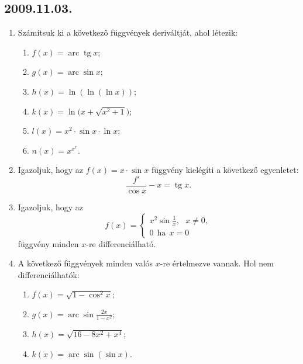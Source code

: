 \documentclass{article}
\newenvironment{abc}{\begin{enumerate}[label=\textit{\alph*})]}{\end{enumerate}}
\newcommand{\tg}{\mathop{\mathrm{tg}}\nolimits}
\newcommand{\arc}{\mathop{\mathrm{arc}}\nolimits}
\renewcommand{\arcsin}{\arc\sin}
\newcommand{\arctg}{\arc\tg}
\begin{document}
\subsection*{2009.11.03.}
\begin{enumerate}
\item Számítsuk ki a következő függvények deriváltját, ahol létezik:
	\begin{abc}
	\item $f(x)=\arctg x$;
	\item $g(x)=\arcsin x$;
	\item $h(x)=\ln(\ln(\ln x))$;
	\item $k(x)=\ln \big(x+\sqrt{x^2+1}\big)$;
	\item $l(x)=x^2\cdot \sin x \cdot \ln x$;
	\item $n(x)=x^{x^x}$.
	\end{abc}
\item Igazoljuk, hogy az $f(x)=x\cdot \sin x$ függvény kielégíti a következő egyenletet:
	\[ \frac{f'}{\cos x}-x=\tg x. \]
\item Igazoljuk, hogy az 
	\[  f(x) = 
	  \begin{cases} 
	   x^2 \sin \frac{1}{x},~~~x\neq 0, \\
	   0~~\text{ha}~~x =0
	  \end{cases} \]
	  függvény minden $x$-re differenciálható.
\item A következő függvények minden valós $x$-re értelmezve vannak. Hol nem 					differenciálhatók:
	\begin{abc}
	\item $f(x)=\sqrt{1-\cos^2 x}$;
	\item $g(x)=\arcsin \frac{2x}{1-x^2}$;
	\item $h(x)=\sqrt{16-8x^2+x^4}$;
	\item $k(x)=\arcsin (\sin x)$.
	\end{abc}
\end{enumerate}
\end{document}
